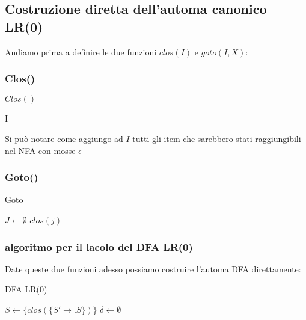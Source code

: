 \subsection{Costruzione diretta dell’automa canonico LR(0)}
Andiamo prima a definire le due funzioni $clos(I)$ e $goto(I,X)$:

\subsubsection{Clos()}
\begin{algorithm}
    \caption{$Clos()$}

    \Return I\;
\end{algorithm}

Si può notare come aggiungo ad $I$  tutti gli item che sarebbero stati raggiungibili nel NFA con mosse $\epsilon$
\subsubsection{Goto()}

\begin{algorithm}
    \caption{Goto}

    $J \gets \emptyset$\;
    \Return $clos(j)$ 
\end{algorithm}

\subsubsection{algoritmo per il lacolo del DFA LR(0)}
Date queste due funzioni adesso possiamo costruire l’automa DFA direttamente:

\begin{algorithm}
    \caption{DFA LR(0)}
    $S \gets \{clos(\{S' \to .S\})\}$\;
    $\delta\gets \emptyset$\;
\end{algorithm}


